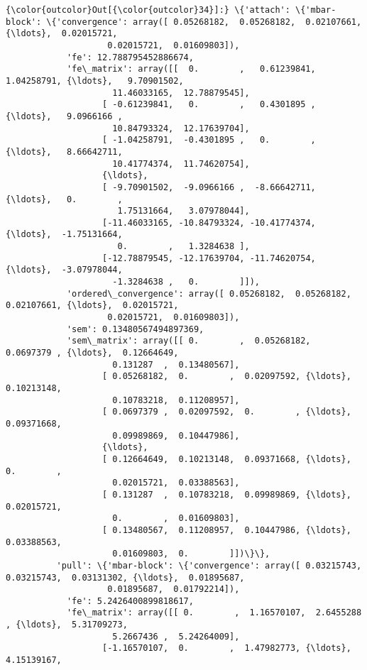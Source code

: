 \documentclass[11pt]{article}
\begin{document}
\begin{Verbatim}[commandchars=\\\{\}]
{\color{outcolor}Out[{\color{outcolor}34}]:} \{'attach': \{'mbar-block': \{'convergence': array([ 0.05268182,  0.05268182,  0.02107661, {\ldots},  0.02015721,
                    0.02015721,  0.01609803]),
            'fe': 12.788795452886674,
            'fe\_matrix': array([[  0.        ,   0.61239841,   1.04258791, {\ldots},   9.70901502,
                     11.46033165,  12.78879545],
                   [ -0.61239841,   0.        ,   0.4301895 , {\ldots},   9.0966166 ,
                     10.84793324,  12.17639704],
                   [ -1.04258791,  -0.4301895 ,   0.        , {\ldots},   8.66642711,
                     10.41774374,  11.74620754],
                   {\ldots}, 
                   [ -9.70901502,  -9.0966166 ,  -8.66642711, {\ldots},   0.        ,
                      1.75131664,   3.07978044],
                   [-11.46033165, -10.84793324, -10.41774374, {\ldots},  -1.75131664,
                      0.        ,   1.3284638 ],
                   [-12.78879545, -12.17639704, -11.74620754, {\ldots},  -3.07978044,
                     -1.3284638 ,   0.        ]]),
            'ordered\_convergence': array([ 0.05268182,  0.05268182,  0.02107661, {\ldots},  0.02015721,
                    0.02015721,  0.01609803]),
            'sem': 0.13480567494897369,
            'sem\_matrix': array([[ 0.        ,  0.05268182,  0.0697379 , {\ldots},  0.12664649,
                     0.131287  ,  0.13480567],
                   [ 0.05268182,  0.        ,  0.02097592, {\ldots},  0.10213148,
                     0.10783218,  0.11208957],
                   [ 0.0697379 ,  0.02097592,  0.        , {\ldots},  0.09371668,
                     0.09989869,  0.10447986],
                   {\ldots}, 
                   [ 0.12664649,  0.10213148,  0.09371668, {\ldots},  0.        ,
                     0.02015721,  0.03388563],
                   [ 0.131287  ,  0.10783218,  0.09989869, {\ldots},  0.02015721,
                     0.        ,  0.01609803],
                   [ 0.13480567,  0.11208957,  0.10447986, {\ldots},  0.03388563,
                     0.01609803,  0.        ]])\}\},
          'pull': \{'mbar-block': \{'convergence': array([ 0.03215743,  0.03215743,  0.03131302, {\ldots},  0.01895687,
                    0.01895687,  0.01792214]),
            'fe': 5.2426400899818617,
            'fe\_matrix': array([[ 0.        ,  1.16570107,  2.6455288 , {\ldots},  5.31709273,
                     5.2667436 ,  5.24264009],
                   [-1.16570107,  0.        ,  1.47982773, {\ldots},  4.15139167,

\end{Verbatim}
\end{document}
